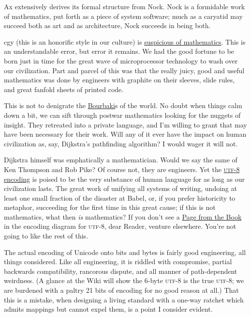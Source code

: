 \documentclass[twoside]{article}
\begin{document}
Ax extensively derives its formal structure from Nock. Nock is a formidable work of mathematics, put forth as a piece of system software; much as a caryatid may succeed both as art and as architecture, Nock succeeds in being both.

cgy (this is an honorific style in our culture) is \href{https://unqualifiedreservations.wordpress.com/2007/08/02/whats-wrong-with-cs-research/}{suspicious of mathematics}. This is an understandable error, but error it remains. We had the good fortune to be born just in time for the great wave of microprocessor technology to wash over our civilization. Part and parcel of this was that the really juicy, good and useful mathematics was done by engineers with graphite on their sleeves, slide rules, and great fanfold sheets of printed code.

This is not to denigrate the \href{https://en.wikipedia.org/wiki/Nicolas_Bourbaki}{Bourbaki}s of the world. No doubt when things calm down a bit, we can sift through postwar mathematics looking for the nuggets of insight. They retreated into a private language, and I'm willing to grant that may have been necessary for their work.  Will any of it ever have the impact on human civilization as, say, Dijkstra's pathfinding algorithm? I would wager it will not.

Dijkstra himself was emphatically a mathematician. Would we say the same of Ken Thompson and Rob Pike? Of course not, they are engineers. Yet the \href{https://en.wikipedia.org/wiki/UTF-8#History}{\textsc{utf}-8 encoding} is poised to be the very substance of human language for as long as our civilization lasts. The great work of unifying all systems of writing, undoing at least one small fraction of the disaster at Babel, or, if you prefer historicity to metaphor, succeeding for the first time in this great cause; if this is not mathematics, what then \emph{is} mathematics? If you don't see a \href{https://en.wikipedia.org/wiki/Erdős_Pál}{Page from the Book} in the encoding diagram for \textsc{utf}-8, dear Reader, venture elsewhere. You're not going to like the rest of this.

The actual encoding of Unicode onto bits and bytes is fairly good engineering, all things considered. Like all engineering, it is riddled with compromise, partial backwards compatibility, rancorous dispute, and all manner of path-dependent weirdness. (A glance at the Wiki will show the 6-byte \textsc{utf}-8 is the true \textsc{utf}-8; we are burdened with a paltry 21 bits of encoding for no good reason at all.) That this is a mistake, when designing a living standard with a one-way ratchet which admits mappings but cannot expel them, is a point I consider evident.
\end{document}
